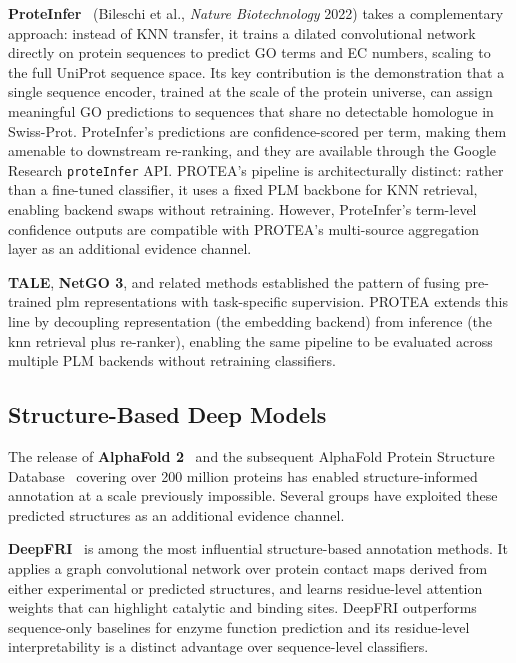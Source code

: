 \textbf{ProteInfer}~\cite{bileschi2022proteInfer} (Bileschi et al., \textit{Nature
Biotechnology} 2022) takes a complementary approach: instead of KNN transfer, it
trains a dilated convolutional network directly on protein sequences to predict
GO terms and EC numbers, scaling to the full UniProt sequence space. Its key
contribution is the demonstration that a single sequence encoder, trained at
the scale of the protein universe, can assign meaningful GO predictions to
sequences that share no detectable homologue in Swiss-Prot. ProteInfer's
predictions are confidence-scored per term, making them amenable to downstream
re-ranking, and they are available through the Google Research
\texttt{proteInfer} API. PROTEA's pipeline is architecturally distinct: rather
than a fine-tuned classifier, it uses a fixed PLM backbone for KNN retrieval,
enabling backend swaps without retraining. However, ProteInfer's term-level
confidence outputs are compatible with PROTEA's multi-source aggregation layer
as an additional evidence channel.

\textbf{TALE}, \textbf{NetGO 3}, and related methods established the pattern of
fusing pre-trained \gls{plm} representations with task-specific supervision.
PROTEA extends this line by decoupling representation (the embedding backend) from
inference (the \gls{knn} retrieval plus re-ranker), enabling the same pipeline to
be evaluated across multiple PLM backends without retraining classifiers.

\subsection{Structure-Based Deep Models}
\label{subsec:related-struct-deep}

The release of \textbf{AlphaFold 2}~\cite{jumper2021alphafold} and the subsequent
AlphaFold Protein Structure Database~\cite{varadi2022afdb} covering over 200
million proteins has enabled structure-informed annotation at a scale previously
impossible. Several groups have exploited these predicted structures as an
additional evidence channel.

\textbf{DeepFRI}~\cite{gligorijevic2021deepfri} is among the most influential
structure-based annotation methods. It applies a graph convolutional network over
protein contact maps derived from either experimental or predicted structures, and
learns residue-level attention weights that can highlight catalytic and binding
sites. DeepFRI outperforms sequence-only baselines for enzyme function prediction
and its residue-level interpretability is a distinct advantage over
sequence-level classifiers.

